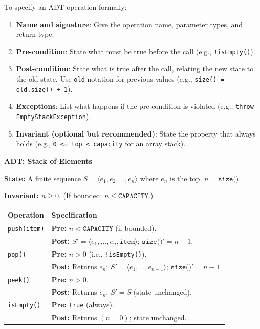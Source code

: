 \documentclass[11pt]{article}
\begin{document}
\begin{methode}
To specify an ADT operation formally:
\begin{enumerate}
    \item \textbf{Name and signature}: Give the operation name, parameter types, and return type.
    \item \textbf{Pre-condition}: State what must be true before the call (e.g., \texttt{!isEmpty()}).
    \item \textbf{Post-condition}: State what is true after the call, relating the new state to the old state. Use \texttt{old} notation for previous values (e.g., \texttt{size() = old.size() + 1}).
    \item \textbf{Exceptions}: List what happens if the pre-condition is violated (e.g., \texttt{throw EmptyStackException}).
    \item \textbf{Invariant (optional but recommended)}: State the property that always holds (e.g., \texttt{0 <= top < capacity} for an array stack).
\end{enumerate}
\end{methode}

\begin{exemplebox}
\textbf{ADT: Stack of Elements}

\textbf{State:} A finite sequence $S = \langle e_1, e_2, \dots, e_n \rangle$ where $e_n$ is the top. $n = \texttt{size()}$.

\textbf{Invariant:} $n \ge 0$. (If bounded: $n \le \texttt{CAPACITY}$.)

\begin{tabularx}{\linewidth}{|l|X|}
\hline
\rowcolor{popblueL}
\textbf{Operation} & \textbf{Specification} \\
\hline
\texttt{push(item)} & \textbf{Pre:} $n < \texttt{CAPACITY}$ (if bounded). \\
& \textbf{Post:} $S' = \langle e_1, \dots, e_n, \texttt{item} \rangle$; $\texttt{size()}' = n+1$. \\
\hline
\texttt{pop()} & \textbf{Pre:} $n > 0$ (i.e., \texttt{!isEmpty()}). \\
& \textbf{Post:} Returns $e_n$; $S' = \langle e_1, \dots, e_{n-1} \rangle$; $\texttt{size()}' = n-1$. \\
\hline
\texttt{peek()} & \textbf{Pre:} $n > 0$. \\
& \textbf{Post:} Returns $e_n$; $S' = S$ (state unchanged). \\
\hline
\texttt{isEmpty()} & \textbf{Pre:} \texttt{true} (always). \\
& \textbf{Post:} Returns $(n = 0)$; state unchanged. \\
\hline
\end{tabularx}
\end{exemplebox}
\end{document}
